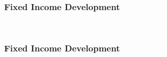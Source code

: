 \documentclass[compress]{beamer}
\begin{document}
{\begin{frame}[plain]
\end{frame}
\begin{frame}[plain]
	\frametitle{Fixed Income Development}
	\textcolor{white}{Putting Curve Fitting and Bond Pricing together..}
	\begin{center}
	\end{center}
\end{frame}
\begin{frame}[plain]
	\frametitle{Fixed Income Development}
	\textcolor{white}{}
	\begin{center}
	\end{center}
\end{frame}
}
\end{document}
